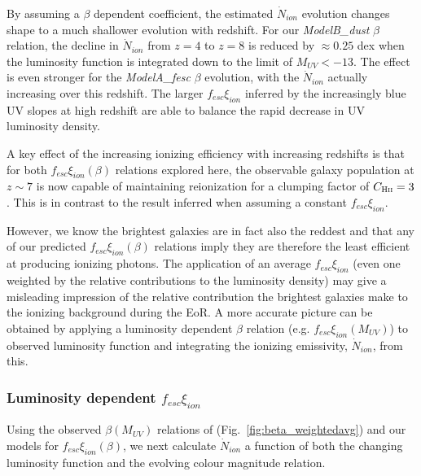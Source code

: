 By assuming a $\beta$ dependent coefficient, the estimated $\dot{N}_{ion}$ evolution changes shape to a much shallower evolution with redshift. For our \emph{ModelB\_dust} $\beta$ relation, the decline in $\dot{N}_{ion}$ from $z=4$ to $z=8$ is reduced by $\approx 0.25$ dex when the luminosity function is integrated down to the limit of $M_{UV} < -13$. The effect is even stronger for the \emph{ModelA\_fesc} $\beta$ evolution, with the $\dot{N}_{ion}$ actually increasing over this redshift. The larger $f_{esc}\xi_{ion}$ inferred by the increasingly blue UV slopes at high redshift are able to balance the rapid decrease in UV luminosity density.

A key effect of the increasing ionizing efficiency with increasing redshifts is that for both $f_{esc}\xi_{ion}(\beta)$ relations explored here, the observable galaxy population at $z\sim7$ is now capable of maintaining reionization for a clumping factor of $C_{\textsc{Hii}} = 3$. This is in contrast to the result inferred when assuming a constant $f_{esc}\xi_{ion}$.  

However, we know the brightest galaxies are in fact also the reddest and that any of our predicted $f_{esc}\xi_{ion}(\beta)$ relations imply they are therefore the least efficient at producing ionizing photons. The application of an average $f_{esc}\xi_{ion}$ (even one weighted by the relative contributions to the luminosity density) may give a misleading impression of the relative contribution the brightest galaxies make to the ionizing background during the EoR. A more accurate picture can be obtained by applying a luminosity dependent $\beta$ relation (e.g. $f_{esc}\xi_{ion}(M_{UV})$) to observed luminosity function and integrating the ionizing emissivity, $\dot{N}_{ion}$, from this.

\subsubsection{Luminosity dependent $f_{esc}\xi_{ion}$}
Using the observed $\beta(M_{UV})$ relations of \citet{Bouwens:2013vf} (Fig.~\ref{fig:beta_weightedavg}) and our models for $f_{esc}\xi_{ion}(\beta)$, we next calculate $\dot{N}_{ion}$ a function of both the changing luminosity function and the evolving colour magnitude relation. 

